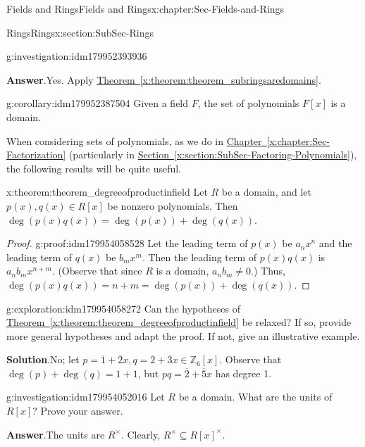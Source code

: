 \documentclass[oneside,10pt,]{book}
\newcommand{\blocktitlefont}{\relax}
\newcommand{\xreffont}{\relax}
\numberwithin{equation}{section}
\def\Z{{\mathbb Z}}
\begin{document}
\begin{chapterptx}{Fields and Rings}{}{Fields and Rings}{}{}{x:chapter:Sec-Fields-and-Rings}
\begin{sectionptx}{Rings}{}{Rings}{}{}{x:section:SubSec-Rings}
\begin{investigation}{}{g:investigation:idm179952393936}
\par\smallskip%
\noindent\textbf{\blocktitlefont Answer}.\hypertarget{g:answer:idm179952388656}{}\quad{}Yes. Apply \hyperref[x:theorem:theorem_subringsaredomains]{Theorem~{\xreffont\ref{x:theorem:theorem_subringsaredomains}}}.%
\end{investigation}
\begin{corollary}{}{}{g:corollary:idm179952387504}%
Given a field \(F\), the set of polynomials \(F[x]\) is a domain.%
\end{corollary}
When considering sets of polynomials, as we do in \hyperref[x:chapter:Sec-Factorization]{Chapter~{\xreffont\ref{x:chapter:Sec-Factorization}}} (particularly in \hyperref[x:section:SubSec-Factoring-Polynomials]{Section~{\xreffont\ref{x:section:SubSec-Factoring-Polynomials}}}), the following results will be quite useful.%
\begin{theorem}{}{}{x:theorem:theorem_degreeofproductinfield}%
Let \(R\) be a domain, and let \(p(x),q(x)\in R[x]\) be nonzero polynomials. Then \(\deg(p(x) q(x)) = \deg(p(x)) + \deg(q(x))\).%
\end{theorem}
\begin{proof}{}{g:proof:idm179954058528}
Let the leading term of \(p(x)\) be \(a_n x^n\) and the leading term of \(q(x)\) be \(b_m x^m\). Then the leading term of \(p(x) q(x)\) is \(a_n b_m x^{n+m}\). (Observe that since \(R\) is a domain, \(a_n b_m \ne 0\).) Thus, \(\deg(p(x) q(x)) = n+m = \deg(p(x)) + \deg(q(x))\).%
\end{proof}
\begin{exploration}{}{g:exploration:idm179954058272}%
Can the hypotheses of \hyperref[x:theorem:theorem_degreeofproductinfield]{Theorem~{\xreffont\ref{x:theorem:theorem_degreeofproductinfield}}} be relaxed? If so, provide more general hypotheses and adapt the proof. If not, give an illustrative example.%
\par\smallskip%
\noindent\textbf{\blocktitlefont Solution}.\hypertarget{g:solution:idm179954053552}{}\quad{}No; let \(p = \overline{1} + \overline{2}x, q = \overline{2} + \overline{3}x\in \Z_6[x]\). Observe that \(\deg(p) + \deg(q) = 1 + 1\), but \(pq = \overline{2} + \overline{5}x\) has degree 1.%
\end{exploration}
\begin{investigation}{}{g:investigation:idm179954052016}%
Let \(R\) be a domain. What are the units of \(R[x]\)? Prove your answer.%
\par\smallskip%
\noindent\textbf{\blocktitlefont Answer}.\hypertarget{g:answer:idm179954050736}{}\quad{}The units are \(R^\times\). Clearly, \(R^\times\subseteq R[x]^\times\).%

\end{investigation}
\end{sectionptx}
\end{chapterptx}
\end{document}
